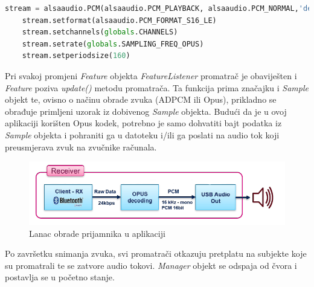 \begin{lstlisting}[language=Python, caption={Postavljanje parametara za dekodiranje audio signala}]
	stream = alsaaudio.PCM(alsaaudio.PCM_PLAYBACK, alsaaudio.PCM_NORMAL,'default')
	stream.setformat(alsaaudio.PCM_FORMAT_S16_LE)
	stream.setchannels(globals.CHANNELS)
	stream.setrate(globals.SAMPLING_FREQ_OPUS)
	stream.setperiodsize(160)
\end{lstlisting}

Pri svakoj promjeni \textit{Feature} objekta \textit{FeatureListener} promatrač je obaviješten i \textit{Feature} poziva \textit{update()} metodu promatrača. Ta funkcija prima značajku i \textit{Sample} objekt te, ovisno o načinu obrade zvuka (ADPCM ili Opus), prikladno se obrađuje primljeni uzorak iz dobivenog \textit{Sample} objekta. Budući da je u ovoj aplikaciji korišten Opus kodek, potrebno je samo dohvatiti bajt podatka iz \textit{Sample} objekta i pohraniti ga u datoteku i/ili ga poslati na audio tok koji preusmjerava zvuk na zvučnike računala. 

\begin{figure}[ht]
	\includegraphics[width=\linewidth]{imgs/duplex_chain_2}
	\caption{Lanac obrade prijamnika u aplikaciji}
	\label{fig:duplex_chain_2}
\end{figure}

Po završetku snimanja zvuka, svi promatrači otkazuju pretplatu na subjekte koje su promatrali te se zatvore audio tokovi. \textit{Manager} objekt se odspaja od čvora i postavlja se u početno stanje.